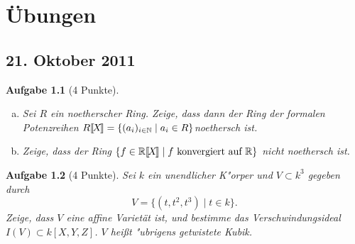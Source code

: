 \documentclass[a4paper, 12pt, numbers=noendperiod, chapterprefix=true]{scrbook}
\renewcommand{\thesection}{\arabic{section}}
\renewcommand*{\othersectionlevelsformat}[3]{\ifstr{#1}{section}{\S\ #3\autodot}{#3\autodot}\enskip}
\renewcommand*{\sectionmarkformat}{\S \thesection\autodot\enskip}
\theoremstyle{break}
\newtheorem{Aufg}{Aufgabe}
\theoremstyle{nonumberbreak}
\theoremstyle{nonumberplain}
\newcommand{\formal}[2]{\mbox{$#1$[\hspace{-0.15em}[\hspace{-0.15em}$#2$\hspace{-0.15em}]\hspace{-0.15em}]}} %
\newcommand{\set}[2]{\{#1\mid #2\}} %
\newcommand{\R}{\mathbb{R}}
\newcommand{\N}{\mathbb{N}}
\begin{document}

\appendix


\chapter{\"Ubungen}

\renewcommand*{\othersectionlevelsformat}[3]{\ifstr{#1}{section}{\"Ubung\ #3\ vom\ }{#3\autodot\enskip}}

\renewcommand*{\sectionmarkformat}{\"Ubung \thesection\autodot\ vom\enskip}

\setcounter{section}{0}

\section{21. Oktober 2011}
\setcounter{Aufg}{0} %
\setcounter{Loes}{0}

\begin{Aufg}[4 Punkte]\begin{enumerate}[a)]
\item
	Sei $R$ ein noetherscher Ring. Zeige, dass dann der Ring der formalen Potenzreihen $\formal{R}{X} = \{(a_i)_{i\in \N} \mid a_i \in R\}$noethersch ist.
\item
	Zeige, dass der Ring $\{ f \in \formal{\R}{X} \mid f \textrm{ konvergiert auf } \R \}$ nicht noethersch ist.
\end{enumerate}\end{Aufg}

\begin{Aufg}[4 Punkte]
Sei $k$ ein unendlicher K"orper und $V\subset k^3$ gegeben durch
	\[V = \set{(t,t^2,t^3)}{t\in k}.\]
Zeige, dass $V$ eine affine Variet\"at ist, und bestimme das Verschwindungsideal $I(V) \subset k[X,Y,Z]$. $V$ hei\ss t "ubrigens \emph{getwistete Kubik}.
\end{Aufg}
\end{document}
